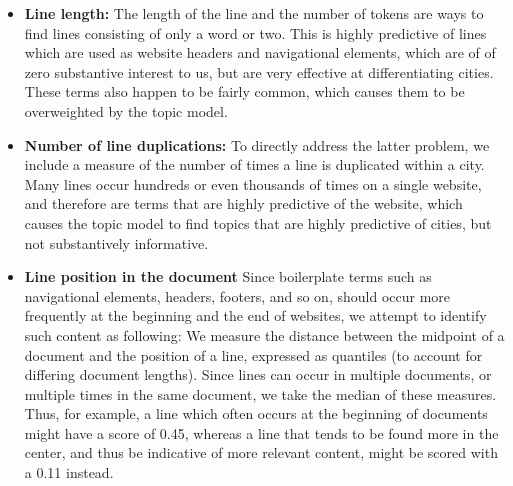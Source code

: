 \documentclass[11pt]{article}
\begin{document}
\begin{itemize}
\item {\bf Line length:} The length of the line and the number of tokens are ways to find lines consisting of only a word or two. This is highly predictive of lines which are used as website headers and navigational elements, which are of of zero substantive interest to us, but are very effective at differentiating cities. These terms also happen to be fairly common, which causes them to be overweighted by the topic model.

\item {\bf Number of line duplications:} To directly address the latter problem, we include a measure of the number of times a line is duplicated within a city. Many lines occur hundreds or even thousands of times on a single website, and therefore are terms that are highly predictive of the website, which causes the topic model to find topics that are highly predictive of cities, but not substantively informative.

\item {\bf Line position in the document} Since boilerplate terms such as navigational elements, headers, footers, and so on, should occur more frequently at the beginning and the end of websites, we attempt to identify such content as following: We measure the distance between the midpoint of a document and the position of a line, expressed as quantiles (to account for differing document lengths). Since lines can occur in multiple documents, or multiple times in the same document, we take the median of these measures. Thus, for example, a line which often occurs at the beginning of documents might have a score of 0.45, whereas a line that tends to be found more in the center, and thus be indicative of more relevant content, might be scored with a 0.11 instead.
\end{itemize}


\end{document}
